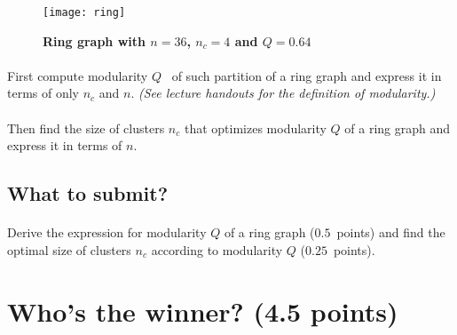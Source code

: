 \documentclass[11pt,a4paper]{article}
\newcommand{\hint}[1]{{\it (#1)}}
\newcommand{\points}[1]{({\color{magenta}$#1$~points})}
\newcommand{\totals}[1]{({\color{magenta}#1 points})}
\begin{document}
\begin{figure}[h] \centering
	\texttt{[image: ring]}
	\caption{{\bf Ring graph with $n=36$, $n_c=4$ and $Q=0.64$}}
	\label{fig:ring}
\end{figure}

\paragraph{} First compute modularity $Q$~\cite{GN02} of such partition of a ring graph and express it in terms of only $n_c$ and $n$. \hint{See lecture handouts for the definition of modularity.}  

\paragraph{} Then find the size of clusters $n_c$ that optimizes modularity $Q$ of a ring graph and express it in terms of $n$.

\subsection*{What to submit?}

\paragraph{} Derive the expression for modularity $Q$ of a ring graph \points{0.5} and find the optimal size of clusters $n_c$ according to modularity $Q$ \points{0.25}.

\section{Who's the winner? \totals{4.5}}
\end{document}
